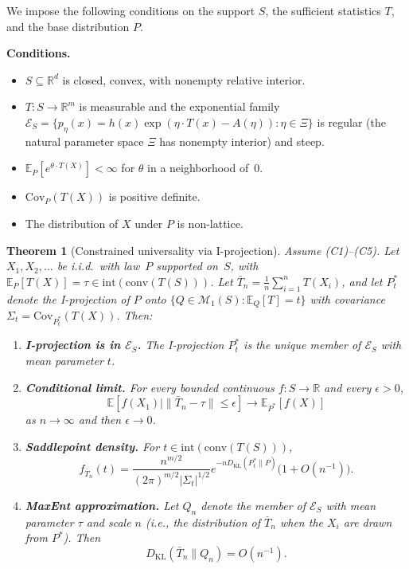 \documentclass[aps,pre,twocolumn,superscriptaddress,nofootinbib]{revtex4-2}
\newtheorem{theorem}{Theorem}
\theoremstyle{definition}
\theoremstyle{remark}
\newcommand{\R}{\mathbb{R}}
\newcommand{\E}{\mathbb{E}}
\newcommand{\Cov}{\mathrm{Cov}}
\newcommand{\KL}{D_{\mathrm{KL}}}
\newcommand{\inte}{\mathrm{int}}
\begin{document}
We impose the following conditions on the support $S$, the sufficient
statistics $T$, and the base distribution $P$.

\medskip\noindent\textbf{Conditions.}
\begin{itemize}
\item[\textbf{(C1)}] $S\subseteq\R^d$ is closed, convex, with nonempty
relative interior.
\item[\textbf{(C2)}] $T\colon S\to\R^m$ is measurable and the exponential
family $\mathcal{E}_S=\{p_\eta(x)=h(x)\exp(\eta\cdot T(x)-A(\eta)):
\eta\in\Xi\}$ is regular (the natural parameter space $\Xi$ has nonempty
interior) and steep.
\item[\textbf{(C3)}] $\E_P[e^{\theta\cdot T(X)}]<\infty$ for $\theta$ in a
neighborhood of~$0$.
\item[\textbf{(C4)}] $\Cov_P(T(X))$ is positive definite.
\item[\textbf{(C5)}] The distribution of $X$ under $P$ is non-lattice.
\end{itemize}

\begin{theorem}[Constrained universality via I-projection]\label{thm:main}
Assume {\rm(C1)--(C5)}.  Let $X_1,X_2,\ldots$ be i.i.d.\ with law~$P$
supported on~$S$, with $\E_P[T(X)]=\tau\in\inte(\mathrm{conv}(T(S)))$.
Let $\bar{T}_n=\frac{1}{n}\sum_{i=1}^n T(X_i)$, and let $P^*_t$ denote the
I-projection of $P$ onto $\{Q\in\mathcal{M}_1(S):\E_Q[T]=t\}$ with
covariance $\Sigma_t=\Cov_{P^*_t}(T(X))$.  Then:
\begin{enumerate}
\item[\rm(a)] \textbf{I-projection is in $\mathcal{E}_S$.}
The I-projection $P^*_t$ is the unique member of $\mathcal{E}_S$ with mean
parameter $t$.
\item[\rm(b)] \textbf{Conditional limit.}
For every bounded continuous $f\colon S\to\R$ and every $\epsilon>0$,
\begin{equation}
\E[f(X_1)\mid\|\bar{T}_n-\tau\|\le\epsilon]\to\E_{P^*}[f(X)]
\end{equation}
as $n\to\infty$ and then $\epsilon\to 0$.
\item[\rm(c)] \textbf{Saddlepoint density.} For $t\in\inte(\mathrm{conv}(T(S)))$,
\begin{equation}\label{eq:saddlepoint}
f_{\bar{T}_n}(t)=\frac{n^{m/2}}{(2\pi)^{m/2}|\Sigma_t|^{1/2}}
e^{-n\KL(P^*_t\|P)}\big(1+O(n^{-1})\big).
\end{equation}
\item[\rm(d)] \textbf{MaxEnt approximation.}
Let $Q_n$ denote the member of $\mathcal{E}_S$ with mean parameter $\tau$ and
scale $n$ (i.e., the distribution of $\bar{T}_n$ when the $X_i$ are drawn
from $P^*$).  Then
\begin{equation}
\KL(\bar{T}_n\|Q_n)=O(n^{-1}).
\end{equation}
\end{enumerate}
\end{theorem}
\end{document}
